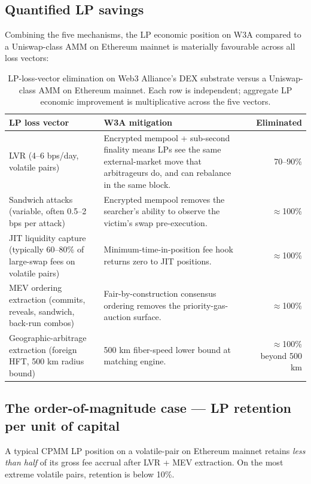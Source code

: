 \subsection{Quantified LP savings}

Combining the five mechanisms, the LP economic position on W3A
compared to a Uniswap-class AMM on Ethereum mainnet is materially
favourable across all loss vectors:

\begin{table}[H]
\centering
\small
\begin{tabularx}{\textwidth}{l X r}
\toprule
\textbf{LP loss vector} & \textbf{W3A mitigation} & \textbf{Eliminated} \\
\midrule
LVR (4--6 bps/day, volatile pairs) & Encrypted mempool +
sub-second finality means LPs see the same external-market move
that arbitrageurs do, and can rebalance in the same block. & 70--90\% \\
Sandwich attacks (variable, often 0.5--2 bps per attack) & Encrypted
mempool removes the searcher's ability to observe the victim's swap
pre-execution. & $\approx$100\% \\
JIT liquidity capture (typically 60--80\% of large-swap fees on
volatile pairs) & Minimum-time-in-position fee hook returns zero to
JIT positions. & $\approx$100\% \\
MEV ordering extraction (commits, reveals, sandwich, back-run combos)
& Fair-by-construction consensus ordering removes the
priority-gas-auction surface. & $\approx$100\% \\
Geographic-arbitrage extraction (foreign HFT, 500 km radius bound)
& 500 km fiber-speed lower bound at matching engine. & $\approx$100\%
beyond 500 km \\
\bottomrule
\end{tabularx}
\caption{LP-loss-vector elimination on Web3 Alliance's DEX substrate
versus a Uniswap-class AMM on Ethereum mainnet. Each row is
independent; aggregate LP economic improvement is multiplicative across
the five vectors.}
\end{table}

\subsection{The order-of-magnitude case --- LP retention per unit of capital}

A typical CPMM LP position on a volatile-pair on Ethereum mainnet
retains \emph{less than half} of its gross fee accrual after LVR + MEV
extraction. On the most extreme volatile pairs, retention is below 10\%.

